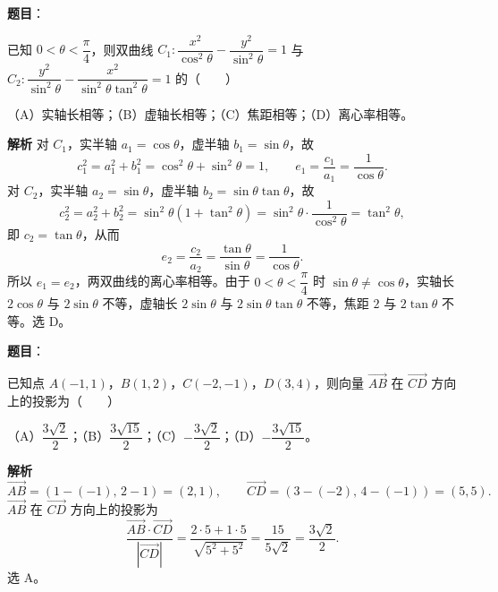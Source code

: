 \begin{answer}

\textbf{题目}：

已知 $0<\theta<\dfrac{\pi}{4}$，则双曲线 $C_1:\dfrac{x^2}{\cos^2\theta}-\dfrac{y^2}{\sin^2\theta}=1$ 与 $C_2:\dfrac{y^2}{\sin^2\theta}-\dfrac{x^2}{\sin^2\theta\tan^2\theta}=1$ 的\mbox{（　　）}

（A）实轴长相等；（B）虚轴长相等；（C）焦距相等；（D）离心率相等。

\textbf{解析}
对 $C_1$，实半轴 $a_1=\cos\theta$，虚半轴 $b_1=\sin\theta$，故
\nopagebreak[4]
\[c_1^2=a_1^2+b_1^2=\cos^2\theta+\sin^2\theta=1,\qquad e_1=\frac{c_1}{a_1}=\frac1{\cos\theta}.\]
对 $C_2$，实半轴 $a_2=\sin\theta$，虚半轴 $b_2=\sin\theta\tan\theta$，故
\nopagebreak[4]
\[c_2^2=a_2^2+b_2^2=\sin^2\theta\left(1+\tan^2\theta\right)
=\sin^2\theta\cdot\frac1{\cos^2\theta}=\tan^2\theta,\]
即 $c_2=\tan\theta$，从而
\nopagebreak[4]
\[e_2=\frac{c_2}{a_2}=\frac{\tan\theta}{\sin\theta}=\frac1{\cos\theta}.\]
所以 $e_1=e_2$，两双曲线的离心率相等。由于 $0<\theta<\dfrac\pi4$ 时 $\sin\theta\neq\cos\theta$，实轴长 $2\cos\theta$ 与 $2\sin\theta$ 不等，虚轴长 $2\sin\theta$ 与 $2\sin\theta\tan\theta$ 不等，焦距 $2$ 与 $2\tan\theta$ 不等。选 D。


\end{answer}
\begin{answer}

\textbf{题目}：

已知点 $A(-1,1)$，$B(1,2)$，$C(-2,-1)$，$D(3,4)$，则向量 $\overrightarrow{AB}$ 在 $\overrightarrow{CD}$ 方向上的投影为\mbox{（　　）}

（A）$\dfrac{3\sqrt2}{2}$；（B）$\dfrac{3\sqrt{15}}{2}$；（C）$-\dfrac{3\sqrt2}{2}$；（D）$-\dfrac{3\sqrt{15}}{2}$。

\textbf{解析}
\nopagebreak[4]
\[\overrightarrow{AB}=(1-(-1),\,2-1)=(2,1),\qquad
\overrightarrow{CD}=(3-(-2),\,4-(-1))=(5,5).\]
$\overrightarrow{AB}$ 在 $\overrightarrow{CD}$ 方向上的投影为
\nopagebreak[4]
\[\frac{\overrightarrow{AB}\cdot\overrightarrow{CD}}{\left|\overrightarrow{CD}\right|}
=\frac{2\cdot5+1\cdot5}{\sqrt{5^2+5^2}}
=\frac{15}{5\sqrt2}=\frac{3\sqrt2}{2}.\]
选 A。


\end{answer}
